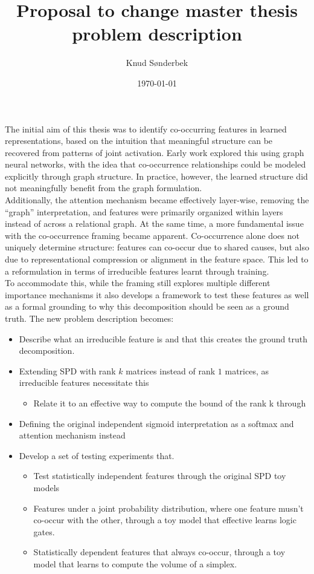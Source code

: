 \documentclass[12pt]{article}
\title{Proposal to change master thesis problem description}
\date{\today}
\author{Knud Sønderbek}
\begin{document}
\maketitle
\newpage
{}
The initial aim of this thesis was to identify co-occurring features in learned representations, based on the intuition that meaningful structure can be recovered from patterns of joint activation. Early work explored this using graph neural networks, with the idea that co-occurrence relationships could be modeled explicitly through graph structure.
In practice, however, the learned structure did not meaningfully benefit from the graph formulation.
\\
Additionally, the attention mechanism became effectively layer-wise, removing the “graph” interpretation, and features were primarily organized within layers instead of across a relational graph.
At the same time, a more fundamental issue with the co-occurrence framing became apparent. Co-occurrence alone does not uniquely determine structure: features can co-occur due to shared causes, but also due to representational compression or alignment in the feature space. 
This led to a reformulation in terms of irreducible features learnt through training.
\\
To accommodate this, while the framing still explores multiple different importance mechanisms it also develops a framework to test these features as well as a formal grounding to why this decomposition should be seen as a ground truth.
The new problem description becomes:

\begin{itemize}
    \item Describe what an irreducible feature is and that this creates the ground truth decomposition. \cite{engels2025languagemodelfeaturesonedimensionally}
    \item Extending SPD with rank $k$ matrices instead of rank $1$ matrices, as irreducible features necessitate this \cite{stochasticparameterdecomposition}
    \begin{itemize}
        \item Relate it to an effective way to compute the bound of the rank k through \autocite{effectiverank}
    \end{itemize}
    \item Defining the original independent sigmoid interpretation as a softmax and attention mechanism instead \cite{stochasticparameterdecomposition}
    \item Develop a set of testing experiments that.
    \begin{itemize}
        \item Test statistically independent features through the original SPD toy models \autocite{stochasticparameterdecomposition}
        \item Features under a joint probability distribution, where one feature musn’t co-occur with the other, through a toy model that effective learns logic gates.
        \item Statistically dependent features that always co-occur, through a toy model that learns to compute the volume of a simplex.
    \end{itemize}
\end{itemize}

\printbibliography
\end{document}
